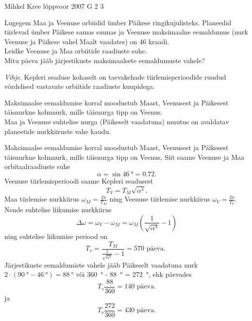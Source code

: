 {Mihkel Kree} %
{lõppvoor} %
{2007} %
{G 2} %
{3} %
{
\ifStatement
Lugegem Maa ja Veenuse orbiidid ümber Päikese ringikujulisteks. Planeedid tiirlevad ümber Päikese samas suunas ja Veenuse maksimaalne eemaldumus (nurk Veenuse ja Päikese vahel Maalt vaadates) on 46 kraadi.\\
\osa Leidke Veenuse ja Maa orbiitide raadiuste suhe.\\
\osa Mitu päeva jääb järjestikuste maksimaalsete eemaldumuste vahele?

\emph{Vihje}. Kepleri seaduse kohaselt on taevakehade tiirlemisperioodide ruudud võrdelised vastavate orbiitide raadiuste kuupidega.
\fi


\ifHint
\osa Maksimaalse eemaldumise korral moodustub Maast, Veenusest ja Päikesest täisnurkne kolmnurk, mille täisnurga tipp on Veenus.\\
\osa Maa ja Veenuse suhtelise nurga (Päikeselt vaadatuna) muutus on avaldatav planeetide nurkkiiruste vahe kaudu.
\fi


\ifSolution
\osa Maksimaalse eemaldumise korral moodustub Maast, Veenusest ja Päikesest täisnurkne kolmnurk, mille täisnurga tipp on Veenus. Siit saame Veenuse ja Maa orbitaalraadiuste suhe
\[
\alpha = \sin \SI{46}{\degree} = \num{0,72}.
\]
\osa Veenuse tiirlemisperioodi saame Kepleri seadusest
\[
T_V = T_M \sqrt{\alpha^3}.
\]
Maa tiirlemise nurkkiirus $\omega_M = \frac{2\pi}{T_M}$ ning Veenuse tiirlemise nurkkiirus $\omega_V = \frac{2\pi}{T_V}$. Nende suhtelise liikumise nurkkiirus
\[
\Delta \omega=\omega_{V}-\omega_{M}=\omega_{M}\left(\frac{1}{\sqrt{\alpha^{3}}}-1\right)
\]
ning suhtelise liikumise periood on
\[
T_{s}=\frac{T_{M}}{\frac{1}{\sqrt{\alpha^{3}}}-1}=570 \text { päeva. }
\]
Järjestikuste eemaldumiste vahele jääb Päikeselt vaadatuna nurk $2\cdot (\SI{90}{\degree} - \SI{46}{\degree}) = \SI{88}{\degree}$ või \SI{360}{\degree} - \SI{88}{\degree} = \SI{272}{\degree}, ehk päevades 
\[
T_s \frac{88}{360} = 140\text{ päeva.}
\]
ja 
\[
T_s \frac{272}{360} = 430\text{ päeva.}
\]
\fi
}